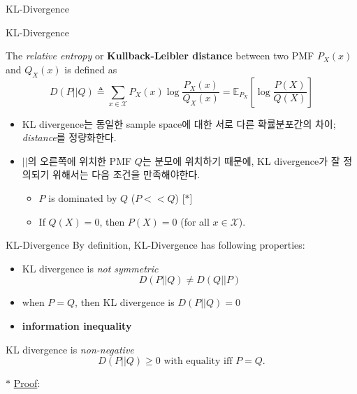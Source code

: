 \documentclass[9pt]{beamer}
\begin{document}
    \begin{section}{KL-Divergence}
        \begin{frame}{KL-Divergence}
            \begin{definition}[KL-divergence]
                The \textit{relative entropy} or \textbf{Kullback-Leibler distance} between two PMF $P_X(x)$ and $Q_X(x)$ is defined as 
                $$D(P || Q) \triangleq \sum_{x \in \mathcal X} P_X(x) \log \frac{P_X(x)}{Q_X(x)} =\mathbb{E}_{P_X}\left[\log \frac{P(X)}{Q(X)}\right] $$
            \end{definition}
            \begin{itemize}
                \item KL divergence는 동일한 sample space에 대한 서로 다른 확률분포간의 차이; \textit{distance}를 정량화한다.
                \item $||$의 오른쪽에 위치한 PMF $Q$는 분모에 위치하기 때문에, KL divergence가 잘 정의되기 위해서는 다음 조건을 만족해야한다.
                \begin{itemize}
                    \item $P$ is dominated by $Q$ ($P<<Q$) [$\ast$] %
                    \item If $Q(X) = 0$, then $P(X)=0$ (for all $x \in \mathcal X$).
                \end{itemize}
            \end{itemize}
        \end{frame}

        \begin{frame}{KL-Divergence}
            By definition, KL-Divergence has following properties:
            \begin{itemize}
                \item KL divergence is \textit{not symmetric}
                $$D(P||Q) \ne D(Q||P)$$
                \item when $P=Q$, then KL divergence is $D(P||Q)=0$
                \item \textbf{information inequality}
            \end{itemize}

            \begin{theorem}
                KL divergence is \textit{non-negative}
                $$ D(P||Q) \ge 0 \text{ with equality iff } P=Q.$$
            \end{theorem}
            $\ast$ \underline{Proof}:
            \vspace{2cm}
        \end{frame}


\end{section}
\end{document}
